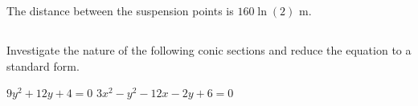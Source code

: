 \begin{Answer}\phantom{}
    The distance between the suspension points is $ 160 \ln(2)$ m.
\end{Answer}

\fi

\subsection*{}

\begin{Exercise} Investigate the nature of the following conic sections and reduce the equation to a standard form.
\begin{multicols}{2} 
	\Question[difficulty = 1] $9y^2+12y+4=0$ 
	\Question[difficulty = 1] $3x^2-y^2-12x-2y+6=0$
    \EndCurrentQuestion
\end{multicols}

\end{Exercise}

